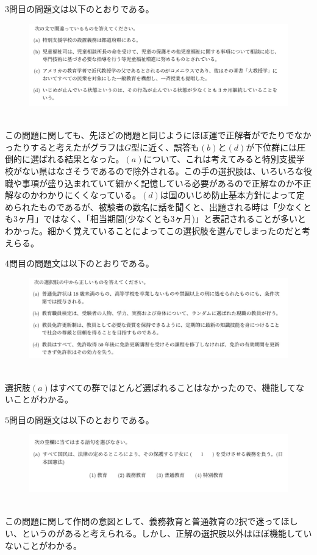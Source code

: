 \documentclass[12pt]{jarticle}
\begin{document}
$3$問目の問題文は以下のとおりである。\\
\hrulefill
\vspace{4.5cm}
\begin{figure}[H]
  \includegraphics[bb = -7 60 1 1,scale = 0.4]{ques_2.png}
\end{figure}
\hrulefill\\
この問題に関しても、先ほどの問題と同じようにほぼ運で正解者がでたりでなかったりすると考えたがグラフは$G$型に近く、誤答も$(b)$と$(d)$が下位群には圧倒的に選ばれる結果となった。$(a)$について、これは考えてみると特別支援学校がない県はなさそうであるので除外される。この手の選択肢は、いろいろな役職や事項が盛り込まれていて細かく記憶している必要があるので正解なのか不正解なのかわかりにくくなっている。$(d)$は国のいじめ防止基本方針によって定められたものであるが、被験者の数名に話を聞くと、出題される時は「少なくとも$3$ヶ月」ではなく、「相当期間(少なくとも$3$ヶ月)」と表記されることが多いとわかった。細かく覚えていることによってこの選択肢を選んでしまったのだと考えらる。

$4$問目の問題文は以下のとおりである。\\
\hrulefill
\vspace{4.5cm}
\begin{figure}[H]
  \includegraphics[bb = -7 60 1 1,scale = 0.4]{ques_3.png}
\end{figure}
\hrulefill\\
選択肢$(a)$はすべての群でほとんど選ばれることはなかったので、機能してないことがわかる。

$5$問目の問題文は以下のとおりである。\\
\hrulefill
\vspace{3cm}
\begin{figure}[H]
  \includegraphics[bb = -7 60 1 1,scale = 0.4]{ques_4.png}
\end{figure}
\hrulefill\\
この問題に関して作問の意図として、義務教育と普通教育の$2$択で迷ってほしい、というのがあると考えられる。しかし、正解の選択肢以外はほぼ機能していないことがわかる。
\end{document}
